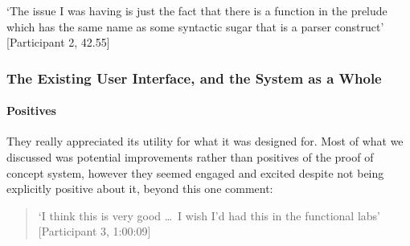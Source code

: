 `The issue I was having is just the fact that there is a function in the prelude which has the same name as some syntactic sugar that is a parser construct' [Participant 2, 42.55]

\subsubsection{The Existing User Interface, and the System as a Whole}
\paragraph{Positives}
They really appreciated its utility for what it was designed for. Most of what we discussed was potential improvements rather than positives of the proof of concept system, however they seemed engaged and excited despite not being explicitly positive about it, beyond this one comment:
    
\begin{quotation}
\noindent `I think this is very good \ldots\ I wish I'd had this in the functional labs' [Participant 3, 1:00:09]
\end{quotation} 

